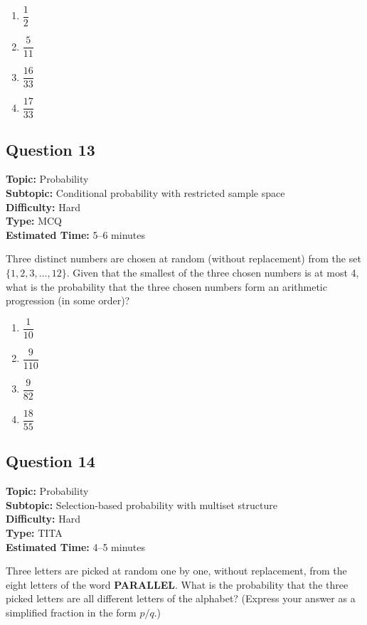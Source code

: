 \documentclass[11pt]{article}
\begin{document}
\begin{enumerate}[label=(\Alph*)]
\item \( \dfrac{1}{2} \)
\item \( \dfrac{5}{11} \)
\item \( \dfrac{16}{33} \)
\item \( \dfrac{17}{33} \)
\end{enumerate}

\subsection*{Question 13}
\textbf{Topic:} Probability \\
\textbf{Subtopic:} Conditional probability with restricted sample space \\
\textbf{Difficulty:} Hard \\
\textbf{Type:} MCQ \\
\textbf{Estimated Time:} 5--6 minutes

\begin{tcolorbox}
Three distinct numbers are chosen at random (without replacement) from the set \( \{1, 2, 3, \ldots, 12\} \). Given that the smallest of the three chosen numbers is at most 4, what is the probability that the three chosen numbers form an arithmetic progression (in some order)?
\end{tcolorbox}

\begin{enumerate}[label=(\Alph*)]
\item \( \dfrac{1}{10} \)
\item \( \dfrac{9}{110} \)
\item \( \dfrac{9}{82} \)
\item \( \dfrac{18}{55} \)
\end{enumerate}

\subsection*{Question 14}
\textbf{Topic:} Probability \\
\textbf{Subtopic:} Selection-based probability with multiset structure \\
\textbf{Difficulty:} Hard \\
\textbf{Type:} TITA \\
\textbf{Estimated Time:} 4--5 minutes

\begin{tcolorbox}
Three letters are picked at random one by one, without replacement, from the eight letters of the word \textbf{PARALLEL}. What is the probability that the three picked letters are all different letters of the alphabet? (Express your answer as a simplified fraction in the form \( p/q \).)
\end{tcolorbox}
\end{document}
